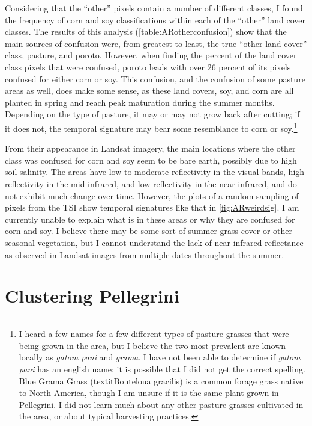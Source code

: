 Considering that the ``other'' pixels contain a number of different classes, I found the frequency of corn and soy classifications within each of the ``other'' land cover classes. The results of this analysis (\autoref{table:ARotherconfusion}) show that the main sources of confusion were, from greatest to least, the true ``other land cover'' class, pasture, and poroto. However, when finding the percent of the land cover class pixels that were confused, poroto leads with over 26 percent of its pixels confused for either corn or soy. This confusion, and the confusion of some pasture areas as well, does make some sense, as these land covers, soy, and corn are all planted in spring and reach peak maturation during the summer months. Depending on the type of pasture, it may or may not grow back after cutting; if it does not, the temporal signature may bear some resemblance to corn or soy.\footnote{I heard a few names for a few different types of pasture grasses that were being grown in the area, but I believe the two most prevalent are known locally as \textit{\textspanish{gatom pani}} and \textit{\textspanish{grama}}. I have not been able to determine if \textit{\textspanish{gatom pani}} has an english name; it is possible that I did not get the correct spelling. Blue Grama Grass (textit{Bouteloua gracilis}) is a common forage grass native to North America, though I am unsure if it is the same plant grown in Pellegrini. I did not learn much about any other pasture grasses cultivated in the area, or about typical harvesting practices.}

From their appearance in Landsat imagery, the main locations where the other class was confused for corn and soy seem to be bare earth, possibly due to high soil salinity. The areas have low-to-moderate reflectivity in the visual bands, high reflectivity in the mid-infrared, and low reflectivity in the near-infrared, and do not exhibit much change over time. However, the plots of a random sampling of pixels from the TSI show temporal signatures like that in \autoref{fig:ARweirdsig}. I am currently unable to explain what is in these areas or why they are confused for corn and soy. I believe there may be some sort of summer grass cover or other seasonal vegetation, but I cannot understand the lack of near-infrared reflectance as observed in Landsat images from multiple dates throughout the summer.

\section{Clustering Pellegrini}

